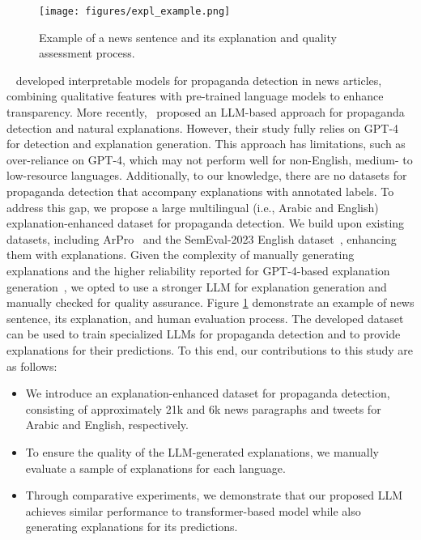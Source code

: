 \begin{figure}[t]
    \centering
    \texttt{[image: figures/expl\_example.png]}
    \vspace{-0.3cm}
    \caption{Example of a news sentence and its explanation and quality assessment process.}
    \label{fig:expl_example}
    \vspace{-0.6cm}
\end{figure}

 ~\citet{RANLP2021:propaganda:interpretable} developed interpretable models for propaganda detection in news articles, combining qualitative features with pre-trained language models to enhance transparency. More recently,~\citet{10.1145/3613904.3642805} proposed an LLM-based approach for propaganda detection and natural explanations. However, their study fully relies on GPT-4 for detection and explanation generation. This approach has limitations, such as over-reliance on GPT-4, which may not perform well for non-English, medium- to low-resource languages. Additionally, to our knowledge, there are no datasets for propaganda detection that accompany explanations with annotated labels. To address this gap, we propose a large multilingual (i.e., Arabic and English) explanation-enhanced dataset for propaganda detection. We build upon existing datasets, including ArPro~\cite{hasanain2024can} and the SemEval-2023 English dataset~\cite{piskorski-etal-2023-semeval}, enhancing them with explanations. Given the complexity of manually generating explanations and the higher reliability reported for GPT-4-based explanation generation~\cite{wang_evaluating_2023}, we opted to use a stronger LLM for explanation generation and manually checked for quality assurance. Figure \ref{fig:expl_example} demonstrate an example of news sentence, its explanation, and human evaluation process. The developed dataset can be used to train specialized LLMs for propaganda detection and to provide explanations for their predictions.  
To this end, our contributions to this study are as follows:
\begin{itemize}[noitemsep,topsep=0pt,labelsep=.5em]
    \item We introduce an explanation-enhanced dataset for propaganda detection, consisting of approximately 21k and 6k news paragraphs and tweets for Arabic and English, respectively.  
    \item To ensure the quality of the LLM-generated explanations, we manually evaluate a sample of explanations for each language.  
    \item Through comparative experiments, we demonstrate that our proposed LLM achieves similar performance to transformer-based model while also generating explanations for its predictions.  
\end{itemize}
